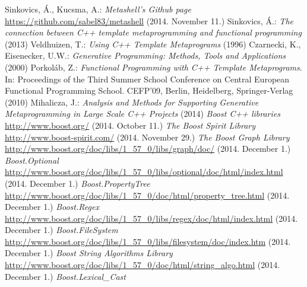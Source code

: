 \documentclass[a4paper,12pt]{report}
\begin{document}
\begin{thebibliography}{99}
    Sinkovics, Á., Kucsma, A.:
    \textit{Metashell's Github page}
    \url{https://github.com/sabel83/metashell} (2014. November 11.)
    Sinkovics, Á.:
    \textit{The connection between C++ template metaprogramming and functional
    programming} (2013)
    Veldhuizen, T.:
    \textit{ Using C++ Template Metaprograms} (1996)
    Czarnecki, K., Eisenecker, U.W.:
    \textit{Generative Programming: Methods, Tools and Applications} (2000)
    Porkoláb, Z.:
    \textit{Functional Programming with C++ Template Metaprograms}.
    In: Proceedings of the Third Summer School Conference on
    Central European Functional Programming School. CEFP’09, Berlin,
    Heidelberg, Springer-Verlag (2010)
    Mihalicza, J.:
    \textit{Analysis and Methods for Supporting Generative Metaprogramming in
    Large Scale C++ Projects} (2014)
    \textit{Boost C++ libraries} \\
    \url{http://www.boost.org/} (2014. October 11.)
    \textit{The Boost Spirit Library} \\
    \url{http://www.boost-spirit.com/} (2014. November 29.)
    \textit{The Boost Graph Library} \\
    \url{http://www.boost.org/doc/libs/1_57_0/libs/graph/doc/}
    (2014. December 1.)
    \textit{Boost.Optional} \\
    \url{http://www.boost.org/doc/libs/1_57_0/libs/optional/doc/html/index.html}
    (2014. December 1.)
    \textit{Boost.PropertyTree} \\
    \url{http://www.boost.org/doc/libs/1_57_0/doc/html/property_tree.html}
    (2014. December 1.)
    \textit{Boost.Regex} \\
    \url{http://www.boost.org/doc/libs/1_57_0/libs/regex/doc/html/index.html}
    (2014. December 1.)
    \textit{Boost.FileSystem} \\
    \url{http://www.boost.org/doc/libs/1_57_0/libs/filesystem/doc/index.htm}
    (2014. December 1.)
    \textit{Boost String Algorithms Library} \\
    \url{http://www.boost.org/doc/libs/1_57_0/doc/html/string_algo.html}
    (2014. December 1.)
    \textit{Boost.Lexical\_Cast} \\

\end{thebibliography}
\end{document}
